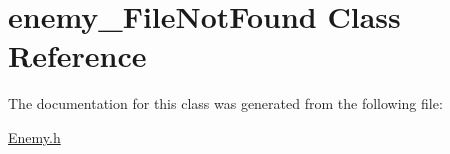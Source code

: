 \hypertarget{classenemy___file_not_found}{}\section{enemy\+\_\+\+File\+Not\+Found Class Reference}
\label{classenemy___file_not_found}


The documentation for this class was generated from the following file\+:\begin{DoxyCompactItemize}
\item 
\hyperlink{_enemy_8h}{Enemy.\+h}\end{DoxyCompactItemize}
